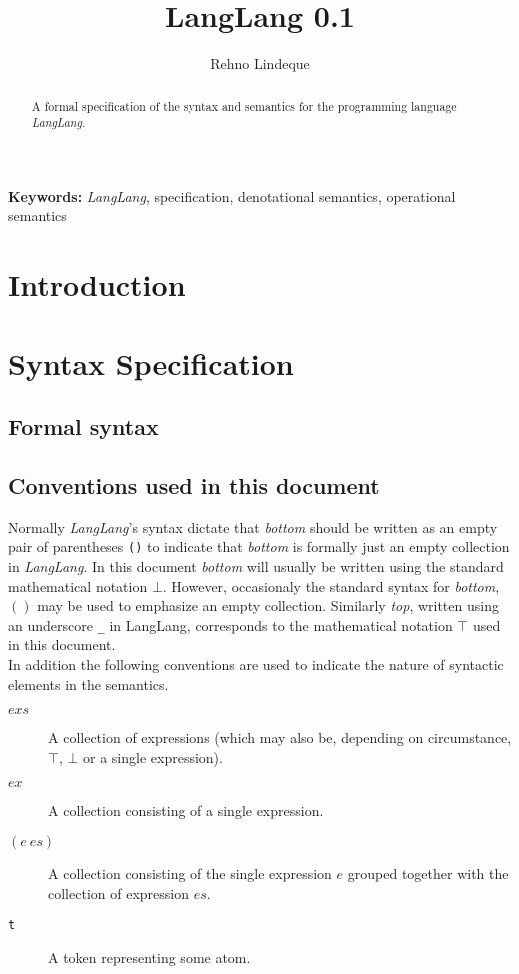 \documentclass[a4paper,11pt]{article}
\begin{document}
\title{LangLang 0.1}
\author{Rehno Lindeque}

\maketitle

\begin{abstract}
A formal specification of the syntax and semantics for the programming language \textsl{LangLang}.
\end{abstract}
\textbf{Keywords:} \textsl{LangLang}, specification, denotational semantics, operational semantics

\section{Introduction}

\section{Syntax Specification}
\subsection{Formal syntax}

\subsection{Conventions used in this document}
\label{sec:conventions}

Normally \textsl{LangLang}'s syntax dictate that \emph{bottom} should be written as an empty pair of parentheses \texttt{()} to indicate that \emph{bottom} is formally just an empty collection in \textsl{LangLang}.
In this document \emph{bottom} will usually be written using the standard mathematical notation $\bot$.
However, occasionaly the standard syntax for \emph{bottom}, $()$ may be used to emphasize an empty collection.
Similarly \emph{top}, written using an underscore \texttt{\_} in LangLang, corresponds to the mathematical notation $\top$ used in this document.\\

In addition the following conventions are used to indicate the nature of syntactic elements in the semantics.

\begin{description}
  \item[$exs$] A collection of expressions (which may also be, depending on circumstance, $\top$, $\bot$ or a single expression).
  \item[$ex$] A collection consisting of a single expression.
  \item[$(e\ es)$] A collection consisting of the single expression $e$ grouped together with the collection of expression $es$.
  \item[\texttt{t}] A token representing some atom.
\end{description}
\end{document}
